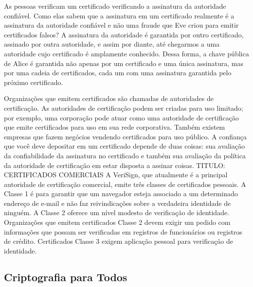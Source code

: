 \documentclass{book}
\begin{document}
As pessoas verificam um certificado verificando a assinatura da autoridade confiável. Como elas sabem que a assinatura em um certificado realmente é a assinatura da autoridade confiável e não uma fraude que Eve criou para emitir certificados falsos? A assinatura da autoridade é garantida por outro certificado, assinado por outra autoridade, e assim por diante, até chegarmos a uma autoridade cujo certificado é amplamente conhecido. Dessa forma, a chave pública de Alice é garantida não apenas por um certificado e uma única assinatura, mas por uma cadeia de certificados, cada um com uma assinatura garantida pelo próximo certificado.

Organizações que emitem certificados são chamadas de autoridades de certificação. As autoridades de certificação podem ser criadas para uso limitado; por exemplo, uma corporação pode atuar como uma autoridade de certificação que emite certificados para uso em sua rede corporativa. Também existem empresas que fazem negócios vendendo certificados para uso público. A confiança que você deve depositar em um certificado depende de duas coisas: sua avaliação da confiabilidade da assinatura no certificado e também sua avaliação da política da autoridade de certificação em estar disposta a assinar coisas.
TITULO: CERTIFICADOS COMERCIAIS
A VeriSign, que atualmente é a principal autoridade de certificação comercial, emite três classes de certificados pessoais. A Classe 1 é para garantir que um navegador esteja associado a um determinado endereço de e-mail e não faz reivindicações sobre a verdadeira identidade de ninguém. A Classe 2 oferece um nível modesto de verificação de identidade. Organizações que emitem certificados Classe 2 devem exigir um pedido com informações que possam ser verificadas em registros de funcionários ou registros de crédito. Certificados Classe 3 exigem aplicação pessoal para verificação de identidade.


\subsection{Criptografia para Todos}
\label{segredos:crip-todos}
\end{document}
